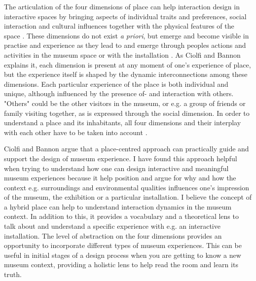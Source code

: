 The articulation of the four dimensions of place can help interaction design in interactive spaces by bringing aspects of individual traits and preferences, social interaction and cultural influences together with the physical features of the space \autocite[p. 163]{hybridplace_ciolfi}. These dimensions do not exist \emph{a priori}, but emerge and become visible in practise and experience as they lead to and emerge through peoples actions and activities in the museum space or with the installation \autocite[p. 163]{hybridplace_ciolfi}. As Ciolfi and Bannon explains it, each dimension is present at any moment of one's experience of place, but the experience itself is shaped by the dynamic interconnections among these dimensions. Each particular experience of the place is both individual and unique, although influenced by the presence of- and interaction with others. "Others" could be the other visitors in the museum, or e.g. a group of friends or family visiting together, as is expressed through the social dimension. In order to understand a place and its inhabitants, all four dimensions and their interplay with each other have to be taken into account \autocite[p. 162]{hybridplace_ciolfi}.

\break

Ciolfi and Bannon argue that a place-centred approach can practically guide and support the design of museum experience. I have found this approach helpful when trying to understand how one can design interactive and meaningful museum experiences because it help position and argue for why and how the context e.g. surroundings and environmental qualities influences one's impression of the museum, the exhibition or a particular installation. I believe the concept of a hybrid place can help to understand interaction dynamics in the museum context. In addition to this, it provides a vocabulary and a theoretical lens to talk about and understand a specific experience with e.g. an interactive installation. The level of abstraction on the four dimensions provides an opportunity to incorporate different types of museum experiences. This can be useful in initial stages of a design process when you are getting to know a new museum context, providing a holistic lens to help read the room and learn its truth. 



